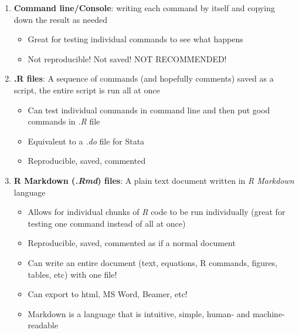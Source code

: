 \documentclass[]{book}
\providecommand{\tightlist}{%
  \setlength{\itemsep}{0pt}\setlength{\parskip}{0pt}}
\theoremstyle{definition}
\theoremstyle{definition}
\theoremstyle{definition}
\theoremstyle{remark}
\begin{document}
\begin{enumerate}
\def\labelenumi{\arabic{enumi}.}
\tightlist
\item
  \textbf{Command line/Console}: writing each command by itself and
  copying down the result as needed

  \begin{itemize}
  \tightlist
  \item
    Great for testing individual commands to see what happens
  \item
    Not reproducible! Not saved! NOT RECOMMENDED!
  \end{itemize}
\item
  \textbf{.R files}: A sequence of commands (and hopefully comments)
  saved as a script, the entire script is run all at once

  \begin{itemize}
  \tightlist
  \item
    Can test individual commands in command line and then put good
    commands in \emph{.R} file
  \item
    Equivalent to a \emph{.do} file for Stata
  \item
    Reproducible, saved, commented
  \end{itemize}
\item
  \textbf{R Markdown (\emph{.Rmd}) files}: A plain text document written
  in \emph{R Markdown} language

  \begin{itemize}
  \tightlist
  \item
    Allows for individual chunks of \emph{R} code to be run individually
    (great for testing one command instead of all at once)
  \item
    Reproducible, saved, commented as if a normal document
  \item
    Can write an entire document (text, equations, R commands, figures,
    tables, etc) with one file!
  \item
    Can export to html, MS Word, Beamer, etc!
  \item
    Markdown is a language that is intuitive, simple, human- and
    machine-readable
  \end{itemize}
\end{enumerate}
\end{document}
